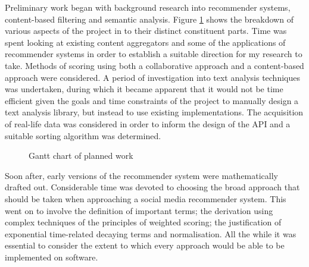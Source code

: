 Preliminary work began with background research into recommender systems, content-based filtering and semantic analysis. Figure \ref{finalGantt} shows the breakdown of various aspects of the project in to their distinct constituent parts. Time was spent looking at existing content aggregators and some of the applications of recommender systems in order to establish a suitable direction for my research to take. Methods of scoring using both a collaborative approach and a content-based approach were considered. A period of investigation into text analysis techniques was undertaken, during which it became apparent that it would not be time efficient given the goals and time constraints of the project to manually design a text analysis library, but instead to use existing implementations. The acquisition of real-life data was considered in order to inform the design of the API and a suitable sorting algorithm was determined.

\begin{figure}[ht!]
    \caption{Gantt chart of planned work}
    \label{finalGantt}
\end{figure} 

Soon after, early versions of the recommender system were mathematically drafted out. Considerable time was devoted to choosing the broad approach that should be taken when approaching a social media recommender system. This went on to involve the definition of important terms; the derivation using complex techniques of the principles of weighted scoring; the justification of exponential time-related decaying terms and normalisation. All the while it was essential to consider the extent to which every approach would be able to be implemented on software. 

